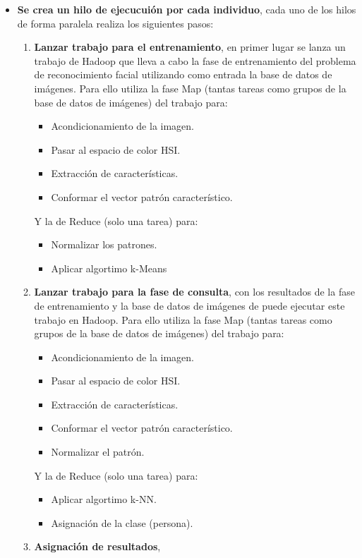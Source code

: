 \begin{itemize}
	\item \textbf{Se crea un hilo de ejecucui\'on por cada individuo}, cada uno de los hilos de forma paralela realiza los siguientes pasos:
	\begin{enumerate}
		\item \textbf{Lanzar trabajo para el entrenamiento}, en primer lugar se lanza un trabajo de Hadoop que lleva a cabo la fase de entrenamiento del problema de reconocimiento facial utilizando como entrada la base de datos de im\'agenes. Para ello utiliza la fase Map (tantas tareas como grupos de la base de datos de im\'agenes) del trabajo para:
		\begin{itemize}
			\item Acondicionamiento de la imagen.
			\item Pasar al espacio de color HSI.
			\item Extracci\'on de caracter\'isticas.
			\item Conformar el vector patr\'on caracter\'istico.
		\end{itemize}
		Y la de Reduce (solo una tarea) para:
		\begin{itemize}
			\item Normalizar los patrones.
			\item Aplicar algortimo k-Means
		\end{itemize}		
		\item \textbf{Lanzar trabajo para la fase de consulta}, con los resultados de la fase de entrenamiento y la base de datos de im\'agenes de puede ejecutar este trabajo en Hadoop. Para ello utiliza la fase Map (tantas tareas como grupos de la base de datos de im\'agenes) del trabajo para:
		\begin{itemize}
			\item Acondicionamiento de la imagen.
			\item Pasar al espacio de color HSI.
			\item Extracci\'on de caracter\'isticas.
			\item Conformar el vector patr\'on caracter\'istico.
			\item Normalizar el patr\'on.
		\end{itemize}
		Y la de Reduce (solo una tarea) para:
		\begin{itemize}
			\item Aplicar algortimo k-NN.
			\item Asignaci\'on de la clase (persona).
		\end{itemize}		
		\item \textbf{Asignaci\'on de resultados}, 
	\end{enumerate}
\end{itemize}

